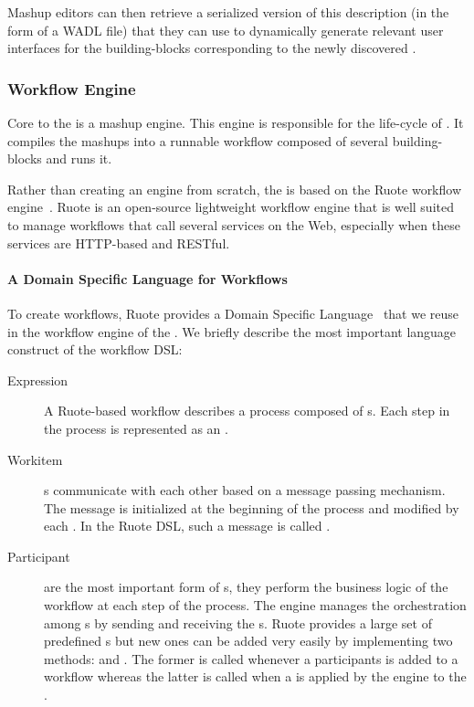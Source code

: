 Mashup editors can then retrieve a serialized version of this description (in the form of a WADL file) that they can use to dynamically generate relevant user interfaces for the building-blocks corresponding to the newly discovered \st{}.

\subsubsection{Workflow Engine}
Core to the \pMashupsFw{} is a mashup engine. This engine is responsible for the life-cycle of \pMashupsFw{}. It compiles the mashups into a runnable workflow composed of several building-blocks and runs it.

Rather than creating an engine from scratch, the \pMashupsFw{} is based on the Ruote workflow engine~. Ruote is an open-source lightweight workflow engine that is well suited to manage workflows that call several services on the Web, especially when these services are HTTP-based and RESTful.

\paragraph{A Domain Specific Language for Workflows}\label{mashupLanguage}
To create workflows, Ruote provides a Domain Specific Language~ that we reuse in the workflow engine of the \pMashupsFw{}. We briefly describe the most important language construct of the workflow DSL:

\begin{description} 
  \item[Expression] A Ruote-based workflow describes a process composed of s. Each step in the process is represented as an .
  
  \item[Workitem] s communicate with each other based on a message passing mechanism. The message is initialized at the beginning of the process and modified by each . In the Ruote DSL, such a message is called .

  \item[Participant] are the most important form of s, they perform the business logic of the workflow at each step of the process. The engine manages the orchestration among s by sending and receiving the s. Ruote provides a large set of predefined s but new ones can be added very easily by implementing two methods:  and . The former is called whenever a participants is added to a workflow whereas the latter is called when a  is applied by the engine to the .
\end{description}

